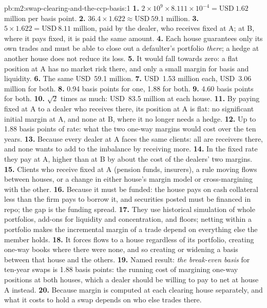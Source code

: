 \begin{solution}{pb:m2:swap-clearing-and-the-ccp-basis:1}
\textbf{1.} $2 \times 10^9 \times 8.111 \times 10^{-4} = \text{USD}~1.62$ million per basis point.
\textbf{2.} $36.4 \times 1.622 \approx \text{USD}~59.1$ million.
\textbf{3.} $5 \times 1.622 = \text{USD}~8.11$ million, paid by the dealer, who receives
fixed at A; at B, where it pays fixed, it is paid the same amount.
\textbf{4.} Each house guarantees only its own trades and must be able to close
out a defaulter's portfolio \emph{there}; a hedge at another house does not
reduce its loss.
\textbf{5.} It would fall towards zero: a flat position at A has no market risk
there, and only a small margin for basis and liquidity.
\textbf{6.} The same USD~59.1 million.
\textbf{7.} USD~1.53 million each, USD~3.06 million for both.
\textbf{8.} 0.94 basis points for one, 1.88 for both.
\textbf{9.} 4.60 basis points for both.
\textbf{10.} $\sqrt 2$ times as much: USD~83.5 million at each house.
\textbf{11.} By paying fixed at A to a dealer who receives there, its position at
A is flat: no significant initial margin at A, and none at B, where it no longer
needs a hedge.
\textbf{12.} Up to 1.88 basis points of rate: what the two one-way margins would
cost over the ten years.
\textbf{13.} Because every dealer at A faces the same clients: all are receivers
there, and none wants to add to the imbalance by receiving more.
\textbf{14.} In the fixed rate they pay at A, higher than at B by about the cost
of the dealers' two margins.
\textbf{15.} Clients who receive fixed at A (pension funds, insurers), a rule
moving flows between houses, or a change in either house's margin model or
cross-margining with the other.
\textbf{16.} Because it must be funded: the house pays on cash collateral less
than the firm pays to borrow it, and securities posted must be financed in
repo; the gap is the funding spread.
\textbf{17.} They use historical simulation of whole portfolios, add-ons for
liquidity and concentration, and floors; netting within a portfolio makes the
incremental margin of a trade depend on everything else the member holds.
\textbf{18.} It forces flows to a house regardless of its portfolio, creating
one-way books where there were none, and so creating or widening a basis
between that house and the others.
\textbf{19.} Named result: \emph{the break-even basis} for ten-year swaps is 1.88 basis
points: the running cost of margining one-way positions at both houses, which a
dealer should be willing to pay to net at house A instead.
\textbf{20.} Because margin is computed at each clearing house separately, and
what it costs to hold a swap depends on who else trades there.
\end{solution}

